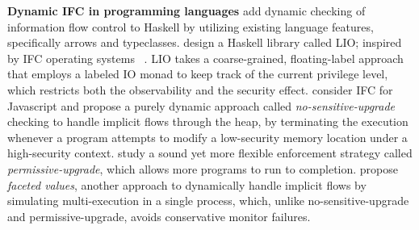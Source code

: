 \textbf{Dynamic IFC in programming languages}
\textcite{li2006encoding,LI20101974} add dynamic checking of
information flow control to Haskell by utilizing existing language
features, specifically arrows and typeclasses.
\textcite{stefan2011flexible,stefan2012flexible,STEFAN:2017ta} design
a Haskell library called LIO; inspired by IFC operating systems
~\parencite{efstathopoulos2005labels,zeldovich2011making,krohn2007information,vandebogart2007labels}.
LIO takes a coarse-grained, floating-label approach that employs a
labeled IO monad to keep track of the current privilege level, which
restricts both the observability and the security
effect.
\textcite{austin2009efficient} consider IFC for Javascript and
propose a purely dynamic approach called \textit{no-sensitive-upgrade}
checking to handle implicit flows through the heap, by terminating the
execution whenever a program attempts to modify a low-security memory
location under a high-security context.
\textcite{austin2010permissive} study a sound yet more flexible
enforcement strategy called \textit{permissive-upgrade}, which allows
more programs to run to
completion. \textcite{austin2012multiple,Austin:2017uh} propose
\textit{faceted values}, another approach to dynamically handle
implicit flows by simulating multi-execution in a single process,
which, unlike no-sensitive-upgrade and permissive-upgrade, avoids
conservative monitor failures.

